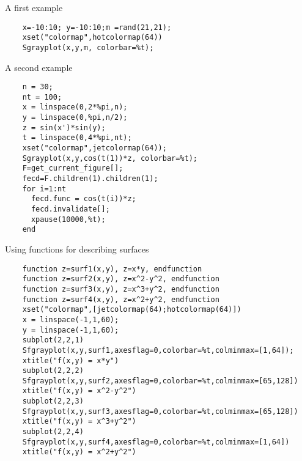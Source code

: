 \begin{examples}
\noindent A first example
  \begin{Verbatim}
    x=-10:10; y=-10:10;m =rand(21,21);
    xset("colormap",hotcolormap(64))
    Sgrayplot(x,y,m, colorbar=%t);
  \end{Verbatim}

\noindent A second example

  \begin{Verbatim}
    n = 30;
    nt = 100;
    x = linspace(0,2*%pi,n);
    y = linspace(0,%pi,n/2);
    z = sin(x')*sin(y);
    t = linspace(0,4*%pi,nt);
    xset("colormap",jetcolormap(64));
    Sgrayplot(x,y,cos(t(1))*z, colorbar=%t);
    F=get_current_figure[];
    fecd=F.children(1).children(1);
    for i=1:nt
      fecd.func = cos(t(i))*z;
      fecd.invalidate[];
      xpause(10000,%t);
    end
  \end{Verbatim}

  \noindent Using functions for describing surfaces

  \begin{Verbatim}
    function z=surf1(x,y), z=x*y, endfunction
    function z=surf2(x,y), z=x^2-y^2, endfunction
    function z=surf3(x,y), z=x^3+y^2, endfunction
    function z=surf4(x,y), z=x^2+y^2, endfunction
    xset("colormap",[jetcolormap(64);hotcolormap(64)])
    x = linspace(-1,1,60);
    y = linspace(-1,1,60);
    subplot(2,2,1)
    Sfgrayplot(x,y,surf1,axesflag=0,colorbar=%t,colminmax=[1,64]);
    xtitle("f(x,y) = x*y")
    subplot(2,2,2)
    Sfgrayplot(x,y,surf2,axesflag=0,colorbar=%t,colminmax=[65,128])
    xtitle("f(x,y) = x^2-y^2")
    subplot(2,2,3)
    Sfgrayplot(x,y,surf3,axesflag=0,colorbar=%t,colminmax=[65,128])
    xtitle("f(x,y) = x^3+y^2")
    subplot(2,2,4)
    Sfgrayplot(x,y,surf4,axesflag=0,colorbar=%t,colminmax=[1,64])
    xtitle("f(x,y) = x^2+y^2")
  \end{Verbatim}


\end{examples}
\begin{manseealso}
\end{manseealso}
